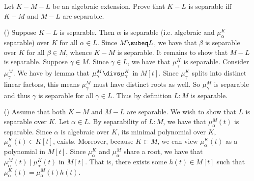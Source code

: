 \documentclass{article}
\begin{document}
\begin{exercise}
  Let \( K-M-L \) be an algebraic extension.
  Prove that \( K-L \) is separable iff \( K-M \) and \( M-L \) are separable.
\end{exercise}
\begin{solution}
  (\imp) Suppose \( K-L \) is separable.
  Then \( \alpha \) is separable (i.e. algebraic and \( \mu_\alpha^K \) separable) over \( K \) for all \( \alpha\in L \).
  Since \( M\subeq L \), we have that \( \beta \) is separable over \( K \) for all \( \beta\in M \), whence \( K-M \) is separable.
  It remains to show that \( M-L \) is separable.
  Suppose \( \gamma\in M \).
  Since \( \gamma\in L \), we have that \( \mu_\gamma^K \) is separable.
  Consider \( \mu_\gamma^M \).
  We have by lemma that \( \mu_\gamma^M\divs \mu_\gamma^K \) in \( M[t] \).
  Since \( \mu_\gamma^K \) splits into distinct linear factors, this means \( \mu_\gamma^M \) must have distinct roots as well.
  So \( \mu_\gamma^M \) is separable and thus \( \gamma \) is separable for all \( \gamma\in L \).
  Thus by definition \( L:M \) is separable.

  (\pmi) Assume that both \( K-M \) and \( M-L \) are separable.
  We wish to show that \( L \) is separable over \( K \).
  Let \( \alpha\in L \). By separability of \( L:M \), we have that \( \mu_{\alpha}^{M}(t) \) is separable.
  Since \( \alpha \) is algebraic over \( K \), its minimal polynomial over \( K \), \( \mu_{\alpha}^{K}(t)\in K[t] \), exists.
  Moreover, because \( K\subset M \), we can view \( \mu_{\alpha}^{K}(t) \) as a polynomial in \( M[t] \).
  Since \( \mu_\alpha^K \) and \( \mu_\alpha^M \) share a root, we have that \( \mu_{\alpha}^{M}(t)\mid \mu_{\alpha}^{K}(t) \) in \( M[t] \).
  That is, there exists some \( h(t)\in M[t] \) such that \( \mu_{\alpha}^{K}(t)=\mu_{\alpha}^{M}(t) h(t) \).


\end{solution}
\end{document}
